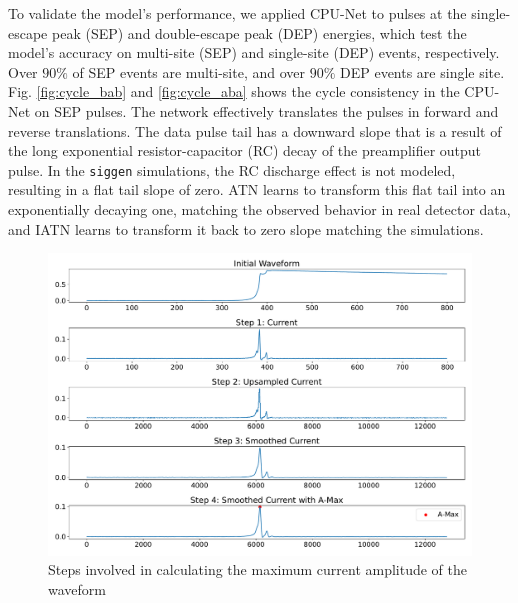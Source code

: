 
To validate the model’s performance, we applied CPU-Net to pulses at the single-escape peak (SEP) and double-escape peak (DEP) energies, which test the model’s accuracy on multi-site (SEP) and single-site (DEP) events, respectively. Over $90\%$ of SEP events are multi-site, and over $90\%$ DEP events are single site. Fig. \ref{fig:cycle_bab} and \ref{fig:cycle_aba}  shows the cycle consistency in the CPU-Net on SEP pulses. The network effectively translates the pulses in forward and reverse translations. The data pulse tail has a downward slope that is a result of the long exponential resistor-capacitor (RC) decay of the preamplifier output pulse. In the \texttt{siggen} simulations, the RC discharge effect is not modeled, resulting in a flat tail slope of zero. ATN learns to transform this flat tail into an exponentially decaying one, matching the observed behavior in real detector data, and IATN learns to transform it back to zero slope matching the simulations.

\begin{figure}%
    \centering
    \includegraphics[width=0.99\linewidth]{ch8/figs/curr_amp_calc.pdf}
    \caption{Steps involved in calculating the maximum current amplitude of the waveform}
    \label{fig:ch8:curr_amp_calc}
\end{figure}

